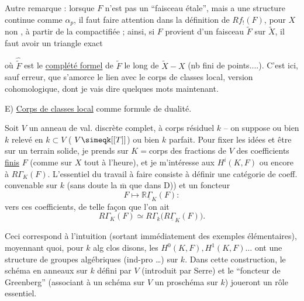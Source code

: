 Autre remarque : lorsque $F$ n'est pas un ``faisceau étale'', mais a une structure continue comme $\alpha_p$, il faut faire attention dans la définition de $Rf_!(F)$, pour $X$ non , à partir de la compactifiée  ; ainsi, si $F$ provient d'un faisceau  $\widetilde F$ sur $\widetilde X$, il faut avoir un triangle exact

où $\widehat{\widetilde F}$ est le \uline{complété formel} de $\widetilde F$ le long de $\widetilde X-X$ (nb fini de points....). C'est ici, sauf erreur, que s'amorce le lien avec le corps de classes local, version cohomologique, dont je vais dire quelques mots maintenant.

E) \uline{Corps de classes local} comme formule de dualité.

Soit $V$ un anneau de val. discrète complet, à corps résiduel $k$ -- on suppose ou bien $k$ relevé en $k\subset V$ ( $V\simeqk[[T]]$) ou bien $k$ parfait. Pour fixer les idées et être sur un terrain solide, je prends  sur $K={}$corps des fractions de $V$ des coefficients \uline{finis} $F$ (comme sur $X$ tout à l'heure), et je m'intéresse aux $H^i(K,F)$ ou encore à $R\Gamma_K(F)$. L'essentiel du travail à faire consiste à définir une catégorie de coeff. convenable sur $k$ (sans doute la $\overline{\mathrm m}$ que dans D)) et un foncteur
\[
 F\longmapsto\mathbb{R}\underline{\Gamma}_K(F):
\]
vers ces coefficients, de telle façon que l'on ait
\[
 R\Gamma_K(F)\simeq R\Gamma_{k}\bigl(R\underline{\Gamma}_K(F)\bigr).
\]

Ceci correspond à l'intuition (sortant immédiatement des exemples élémentaires), moyennant quoi, pour $k$ alg clos disons, les $H^0(K,F), H^1(K,F)\ldots$ ont une structure de groupes algébriques (ind-pro \ldots) sur $k$. Dans cette construction, le schéma en anneaux sur $k$ défini par $V$ (introduit par Serre) et le ``foncteur de Greenberg'' (associant à un schéma sur $V$ un proschéma sur $k$) joueront un rôle essentiel.


